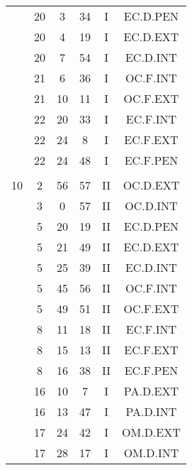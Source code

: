 \documentclass[12pt, a4paper]{article}
\begin{document}
\begin{multicols}{3}
{\begin{tabular}{c c c c c c}
	 	 	 	 & 20 & 3 & 34 & I & EC.D.PEN\\%
	 	 	 	 & 20 & 4 & 19 & I & EC.D.EXT\\%
	 	 	 	 & 20 & 7 & 54 & I & EC.D.INT\\%
	 	 	 	 & 21 & 6 & 36 & I & OC.F.INT\\%
	 	 	 	 & 21 & 10 & 11 & I & OC.F.EXT\\%
	 	 	 	 & 22 & 20 & 33 & I & EC.F.INT\\%
	 	 	 	 & 22 & 24 & 8 & I & EC.F.EXT\\%
	 	 	 	 & 22 & 24 & 48 & I & EC.F.PEN\\%
	 	 	 	 & & & & & \\%
	 	 	 	10 & 2 & 56 & 57 & II & OC.D.EXT\\%
	 	 	 	 & 3 & 0 & 57 & II & OC.D.INT\\%
	 	 	 	 & 5 & 20 & 19 & II & EC.D.PEN\\%
	 	 	 	 & 5 & 21 & 49 & II & EC.D.EXT\\%
	 	 	 	 & 5 & 25 & 39 & II & EC.D.INT\\%
	 	 	 	 & 5 & 45 & 56 & II & OC.F.INT\\%
	 	 	 	 & 5 & 49 & 51 & II & OC.F.EXT\\%
	 	 	 	 & 8 & 11 & 18 & II & EC.F.INT\\%
	 	 	 	 & 8 & 15 & 13 & II & EC.F.EXT\\%
	 	 	 	 & 8 & 16 & 38 & II & EC.F.PEN\\%
	 	 	 	 & 16 & 10 & 7 & I & PA.D.EXT\\%
	 	 	 	 & 16 & 13 & 47 & I & PA.D.INT\\%
	 	 	 	 & 17 & 24 & 42 & I & OM.D.EXT\\%
	 	 	 	 & 17 & 28 & 17 & I & OM.D.INT\\%

\end{tabular}}
\end{multicols}
\end{document}
